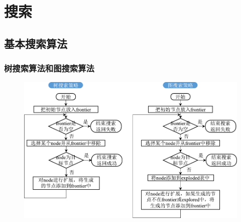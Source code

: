 \section{搜索}
\subsection{基本搜索算法}
\subsubsection{树搜索算法和图搜索算法}
\begin{figure}[htbp]
    \centering
    \includegraphics{image/图搜索和树搜索.pdf}
\end{figure}

